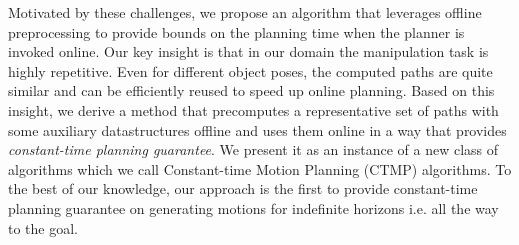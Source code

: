 \documentclass[a4paper]{report}
\begin{document}
Motivated by these challenges, we propose an algorithm that leverages offline preprocessing to provide bounds on the planning time when the planner is invoked online. Our key insight is that in our domain the manipulation task is highly repetitive. Even for different object poses, the computed paths are quite similar and can be efficiently reused to speed up online planning. Based on this insight, we derive a method that precomputes a representative set of paths with some auxiliary datastructures offline and uses them online in a way that provides \emph{constant-time planning guarantee}.
We present it as an instance of a new class of algorithms which we call Constant-time Motion Planning (CTMP) algorithms.
To the best of our knowledge, our approach is the first to provide constant-time planning guarantee on generating motions for indefinite horizons i.e. all the way to the goal.
\end{document}
